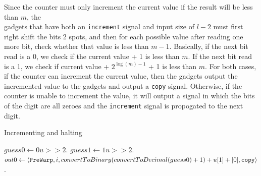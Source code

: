 \begin{itemize}
    Since the counter must only increment the current value if the result will be less than $m$,
    the \\{\cread} gadgets that have both an {\tt increment} signal and input size of $l - 2$ must
    first right shift the bits 2 spots, and then for each possible value after reading one more bit,
    check whether that value is less than $m - 1$. %
    Basically, if the next bit read is a 0, we check if the current value + 1 is less than $m$.
    If the next bit read is a 1, we check if current value + $2^{\log (m) - 1}$ + 1 is less than $m$.
    For both cases, if the counter can increment the current value, then the {\cread} gadgets output the incremented value to the {\prewarp} gadgets and output a {\tt copy} signal.
    Otherwise, if the counter is unable to increment the value, it will output a signal in which the bits of the digit are all zeroes and the {\tt increment} signal is propogated to the next digit.
    \begin{algorithm}
        \caption{Incrementing and halting\label{asda}}
        \begin{algorithmic}[1]
                \State $guess0 \gets 0u >> 2$.
                \State $guess1 \gets 1u >> 2$.
                    \State $out0 \gets \left\langle {\tt PreWarp}, i, convertToBinary(convertToDecimal(guess0) + 1) + u[1] + [0], {\tt copy} \right\rangle$.

\end{algorithmic}
\end{algorithm}
\end{itemize}
